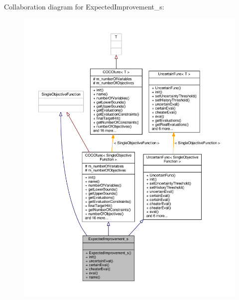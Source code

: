 Collaboration diagram for Expected\+Improvement\+\_\+s\+:
\nopagebreak
\begin{figure}[H]
\begin{center}
\leavevmode
\includegraphics[width=350pt]{classExpectedImprovement__s__coll__graph}
\end{center}
\end{figure}
